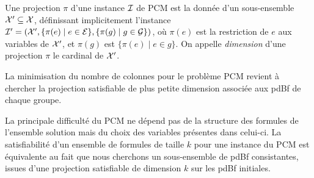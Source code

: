\begin{definition}[Projection]
Une projection $\pi$ d'une instance ${\cal I}$ de PCM est la donnée d'un
sous-ensemble ${\cal X'} \subseteq {\cal X}$, définissant implicitement
l'instance ${\cal I'} = ({\cal X'},\{\pi(e) \mid e \in  {\cal E} \},\{ \pi(g)
\mid g \in {\cal G}\})$, où $\pi(e)$ est la restriction de $e$ aux variables de
${\cal X'}$, et $\pi(g)$ est $\{\pi(e)\mid e\in g\}$. On appelle
\emph{dimension} d'une projection $\pi$  le cardinal de ${\cal X'}$.
\end{definition}

La minimisation du nombre de colonnes pour le problème PCM revient à chercher la
projection satisfiable de plus petite dimension associée aux pdBf de chaque
groupe.

La principale difficulté du PCM ne dépend pas de la structure des formules de
l'ensemble solution mais du choix des variables présentes dans celui-ci. La
satisfiabilité d'un ensemble de formules de taille $k$  pour une instance du PCM est équivalente au fait que nous cherchons un sous-ensemble de pdBf consistantes, issues d'une projection satisfiable de dimension $k$ sur les pdBf initiales.


